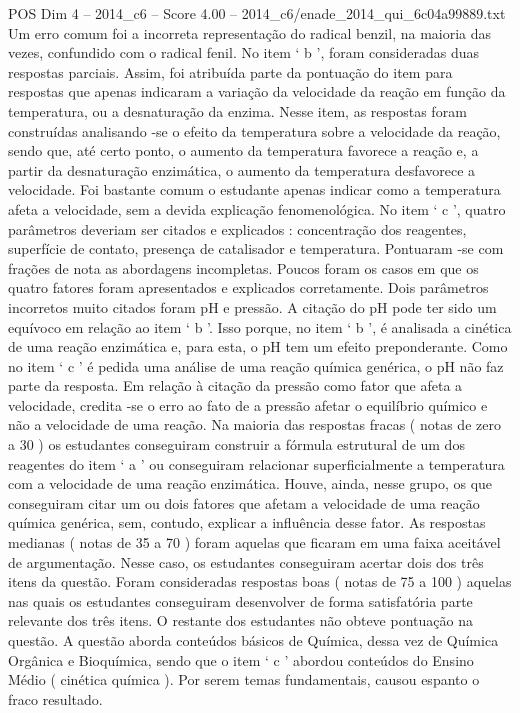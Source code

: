 \begin{textsample}{POS Dim 4 – 2014\_c6 – Score 4.00 – 2014\_c6/enade\_2014\_qui\_6c04a99889.txt}
Um erro comum foi a incorreta representação do radical benzil, na maioria das vezes, confundido com o radical fenil.
No item ‘ b ’, foram consideradas duas respostas parciais.
Assim, foi atribuída parte da pontuação do item para respostas que apenas indicaram a variação da velocidade da reação em função da temperatura, ou a desnaturação da enzima.
Nesse item, as respostas foram construídas analisando -se o efeito da temperatura sobre a velocidade da reação, sendo que, até certo ponto, o aumento da temperatura favorece a reação e, a partir da desnaturação enzimática, o aumento da temperatura desfavorece a velocidade.
Foi bastante comum o estudante apenas indicar como a temperatura afeta a velocidade, sem a devida explicação fenomenológica.
No item ‘ c ’, quatro parâmetros deveriam ser citados e explicados : concentração dos reagentes, superfície de contato, presença de catalisador e temperatura.
Pontuaram -se com frações de nota as abordagens incompletas.
Poucos foram os casos em que os quatro fatores foram apresentados e explicados corretamente.
Dois parâmetros incorretos muito citados foram pH e pressão.
A citação do pH pode ter sido um equívoco em relação ao item ‘ b ’.
Isso porque, no item ‘ b ’, é analisada a cinética de uma reação enzimática e, para esta, o pH tem um efeito preponderante.
Como no item ‘ c ’ é pedida uma análise de uma reação química genérica, o pH não faz parte da resposta.
Em relação à citação da pressão como fator que afeta a velocidade, credita -se o erro ao fato de a pressão afetar o equilíbrio químico e não a velocidade de uma reação.
Na maioria das respostas fracas ( notas de zero a 30 ) os estudantes conseguiram construir a fórmula estrutural de um dos reagentes do item ‘ a ’ ou conseguiram relacionar superficialmente a temperatura com a velocidade de uma reação enzimática.
Houve, ainda, nesse grupo, os que conseguiram citar um ou dois fatores que afetam a velocidade de uma reação química genérica, sem, contudo, explicar a influência desse fator.
As respostas medianas ( notas de 35 a 70 ) foram aquelas que ficaram em uma faixa aceitável de argumentação.
Nesse caso, os estudantes conseguiram acertar dois dos três itens da questão.
Foram consideradas respostas boas ( notas de 75 a 100 ) aquelas nas quais os estudantes conseguiram desenvolver de forma satisfatória parte relevante dos três itens.
O restante dos estudantes não obteve pontuação na questão.
A questão aborda conteúdos básicos de Química, dessa vez de Química Orgânica e Bioquímica, sendo que o item ‘ c ’ abordou conteúdos do Ensino Médio ( cinética química ).
Por serem temas fundamentais, causou espanto o fraco resultado.

\end{textsample}
